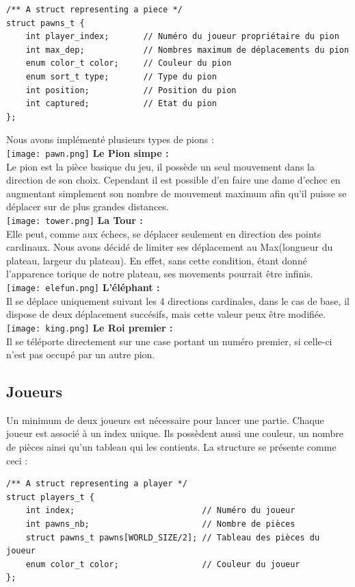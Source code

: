         \begin{lstlisting}
/** A struct representing a piece */
struct pawns_t {
    int player_index;       // Numéro du joueur propriétaire du pion
    int max_dep;            // Nombres maximum de déplacements du pion
    enum color_t color;     // Couleur du pion
    enum sort_t type;       // Type du pion
    int position;           // Position du pion
    int captured;           // Etat du pion
};\end{lstlisting}

        \noindent Nous avons implémenté plusieurs types de pions : \\
            
        \texttt{[image: pawn.png]} \textbf{Le Pion simpe :} \\
        Le pion est la pièce basique du jeu, il possède un seul mouvement dans la direction de son choix. Cependant il est possible d'en faire une dame d'echec en augmentant simplement son nombre de mouvement maximum afin qu'il puisse se déplacer sur de plus grandes distances.\\
            
        \texttt{[image: tower.png]} \textbf{La Tour :} \\
        Elle peut, comme aux échecs, se déplacer seulement en direction des points cardinaux. Nous avons décidé de limiter ses déplacement au Max(longueur du plateau, largeur du plateau). En effet, sans cette condition, étant donné l'apparence torique de notre plateau, ses movements pourrait être infinis. \\
            
        \texttt{[image: elefun.png]} \textbf{L'éléphant :} \\
        Il se déplace uniquement suivant les 4 directions cardinales, dans le cas de base, il dispose de deux déplacement succésifs, mais cette valeur peux être modifiée. \\
            
        \texttt{[image: king.png]} \textbf{Le Roi premier :} \\
        Il se téléporte directement sur une case portant un numéro premier, si celle-ci n'est pas occupé par un autre pion. \\
    
    \subsection{Joueurs}
        Un minimum de deux joueurs est nécessaire pour lancer une partie. Chaque joueur est associé à un index unique. Ils possèdent aussi une couleur, un nombre de pièces ainsi qu'un tableau qui les contients. La structure se présente comme ceci :
        \begin{lstlisting}
/** A struct representing a player */
struct players_t {
    int index;                          // Numéro du joueur 
    int pawns_nb;                       // Nombre de pièces
    struct pawns_t pawns[WORLD_SIZE/2]; // Tableau des pièces du joueur 
    enum color_t color;                 // Couleur du joueur
};\end{lstlisting}

